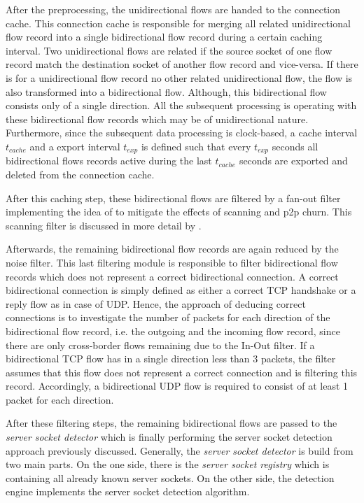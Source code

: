 After the preprocessing, the unidirectional flows are handed to the connection cache. This connection cache is responsible for merging all related unidirectional flow record into a single bidirectional flow record during a certain caching interval. 
Two unidirectional flows are related if the source socket of one flow record match the destination socket of another flow record and vice-versa\citep{Schatzmann:Tracing}. If there is for a unidirectional flow record no other related unidirectional flow, the flow is also transformed into a bidirectional flow. Although, this bidirectional flow consists only of a single direction. All the subsequent processing is operating with these bidirectional flow records which may be of unidirectional nature. 
Furthermore, since the subsequent data processing is clock-based, a cache interval $t_{cache}$ and a export interval $t_{exp}$ is defined such that every $t_{exp}$ seconds all bidirectional flows records active during the last $t_{cache}$ seconds are exported and deleted from the connection cache.

After this caching step, these bidirectional flows are filtered by a fan-out filter implementing the idea of \citet{Allman:2007} to mitigate the effects of scanning and \gls{p2p} churn. This scanning filter is discussed in more detail by \citet{Schatzmann:Mining,Schatzmann:Dissection,Schatzmann:Tracing}.

Afterwards, the remaining bidirectional flow records are again reduced by the noise filter. This last filtering module is responsible to filter bidirectional flow records which does not represent a correct bidirectional connection. A correct bidirectional connection is simply defined as either a correct \gls{TCP} handshake or a reply flow as in case of \gls{UDP}. Hence, the approach of deducing correct connections is to investigate the number of packets for each direction of the bidirectional flow record, i.e. the outgoing and the incoming flow record, since there are only cross-border flows remaining due to the In-Out filter. 
If a bidirectional \gls{TCP} flow has in a single direction less than 3 packets, the filter assumes that this flow does not represent a correct connection and is filtering this record. Accordingly, a bidirectional \gls{UDP} flow is required to consist of at least 1 packet for each direction. 

After these filtering steps, the remaining bidirectional flows are passed to the \emph{server socket detector} which is finally performing the \gls{server socket} detection approach previously discussed. Generally, the \emph{server socket detector} is build from two main parts. On the one side, there is the \emph{server socket registry} which is containing all already known \glspl{server socket}. 
On the other side, the detection engine implements the \gls{server socket} detection algorithm.


